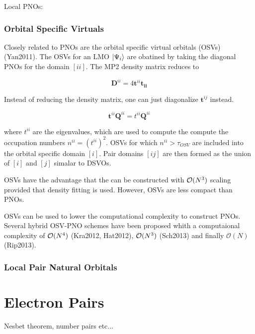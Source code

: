 
Local PNOs:

\subsubsection*{Orbital Specific Virtuals}

Closely related to PNOs are the orbital specific virtual orbitals (OSVs) (Yan2011). The OSVs for an LMO $\ket{\Psi_i}$ are obatined by taking the diagonal PNOs for the domain $[ii]$. The MP2 density matrix reduces to

\begin{equation}
\mathbf{D}^{ii} = 4 \mathbf{t}^{ii} \mathbf{t_{ii}}
\end{equation}

Instead of reducing the density matrix, one can just diagonalize $\mathbf{t}^{ij}$ instead. 

\begin{equation}
\mathbf{t}^{ii} \mathbf{Q}^{ii} = t^{ii} \mathbf{Q}^{ii}
\end{equation}

\noindent where $t^{ii}$ are the eigenvalues, which are used to compute the compute the occupation numbers $n^{ii} = \left( t^{ii} \right)^2$. OSVs for which $n^{ii} > \tau_{OSV}$ are included into the orbital specific domain $[i]$. Pair domains $[ij]$ are then formed as the union of $[i]$ and $[j]$ simalar to DSVOs. 

OSVs have the advantage that the can be constructed with $\mathcal{O}(N^{3})$ scaling provided that density fitting is used. However, OSVs are less compact than PNOs.

OSVs can be used to lower the computational complexity to construct PNOs. Several hybrid OSV-PNO schemes have been proposed whith a computaional complexity of $\mathcal{O}(N^{4})$ (Kra2012, Hat2012), $\mathcal{O}(N^{3})$ (Sch2013) and finally $\mathcal{O}(N)$ (Rip2013).

\subsubsection{Local Pair Natural Orbitals}



\section{Electron Pairs}

Nesbet theorem, number pairs etc...